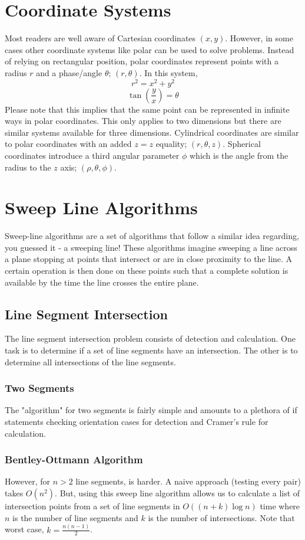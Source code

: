 \documentclass{article}
\begin{document}
\section{Coordinate Systems}
Most readers are well aware of Cartesian coordinates $(x,y)$. However, in some cases other coordinate systems like polar can be used to solve problems. Instead of relying on rectangular position, polar coordinates represent points with a radius $r$ and a phase/angle $\theta$; $(r,\theta)$. In this system,
$$r^{2}=x^{2}+y^{2}$$
$$\tan\left(\frac{y}{x}\right)=\theta$$
Please note that this implies that the same point can be represented in infinite ways in polar coordinates. This only applies to two dimensions but there are similar systems available for three dimensions. Cylindrical coordinates are similar to polar coordinates with an added $z=z$ equality; $(r,\theta,z)$. Spherical coordinates introduce a third angular parameter $\phi$ which is the angle from the radius to the $z$ axis; $(\rho,\theta,\phi)$.

\section{Sweep Line Algorithms}
Sweep-line algorithms are a set of algorithms that follow a similar idea regarding, you guessed it - a sweeping line! These algorithms imagine sweeping a line across a plane stopping at points that intersect or are in close proximity to the line. A certain operation is then done on these points such that a complete solution is available by the time the line crosses the entire plane.

\subsection{Line Segment Intersection}
The line segment intersection problem consists of detection and calculation. One task is to determine if a set of line segments have an intersection. The other is to determine all intersections of the line segments.

\subsubsection{Two Segments}
The "algorithm" for two segments is fairly simple and amounts to a plethora of if statements checking orientation cases for detection and Cramer's rule for calculation.

\subsubsection{Bentley-Ottmann Algorithm}
However, for $n>2$ line segments, is harder. A naive approach (testing every pair) takes $O(n^{2})$. But, using this sweep line algorithm allows us to calculate a list of intersection points from a set of line segments in $O((n+k)\log n)$ time where $n$ is the number of line segments and $k$ is the number of intersections. Note that worst case, $k=\frac{n(n-1)}{2}$.
\end{document}
